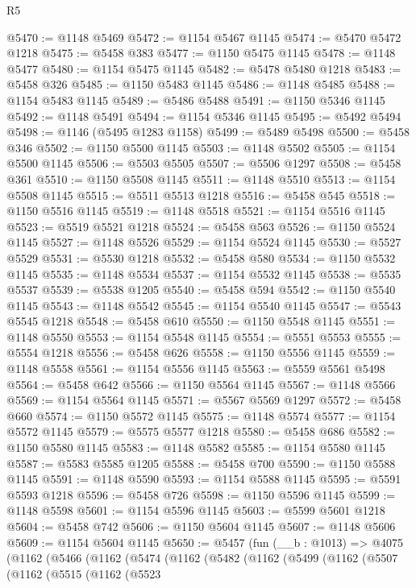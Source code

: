 \begin{lexlean}{R5}
\begin{coremodule}
@5470 := @1148 @5469
@5472 := @1154 @5467 @1145
@5474 := @5470 @5472 @1218
@5475 := @5458 @383
@5477 := @1150 @5475 @1145
@5478 := @1148 @5477
@5480 := @1154 @5475 @1145
@5482 := @5478 @5480 @1218
@5483 := @5458 @326
@5485 := @1150 @5483 @1145
@5486 := @1148 @5485
@5488 := @1154 @5483 @1145
@5489 := @5486 @5488
@5491 := @1150 @5346 @1145
@5492 := @1148 @5491
@5494 := @1154 @5346 @1145
@5495 := @5492 @5494
@5498 := @1146 (@5495 @1283 @1158)
@5499 := @5489 @5498
@5500 := @5458 @346
@5502 := @1150 @5500 @1145
@5503 := @1148 @5502
@5505 := @1154 @5500 @1145
@5506 := @5503 @5505
@5507 := @5506 @1297
@5508 := @5458 @361
@5510 := @1150 @5508 @1145
@5511 := @1148 @5510
@5513 := @1154 @5508 @1145
@5515 := @5511 @5513 @1218
@5516 := @5458 @545
@5518 := @1150 @5516 @1145
@5519 := @1148 @5518
@5521 := @1154 @5516 @1145
@5523 := @5519 @5521 @1218
@5524 := @5458 @563
@5526 := @1150 @5524 @1145
@5527 := @1148 @5526
@5529 := @1154 @5524 @1145
@5530 := @5527 @5529
@5531 := @5530 @1218
@5532 := @5458 @580
@5534 := @1150 @5532 @1145
@5535 := @1148 @5534
@5537 := @1154 @5532 @1145
@5538 := @5535 @5537
@5539 := @5538 @1205
@5540 := @5458 @594
@5542 := @1150 @5540 @1145
@5543 := @1148 @5542
@5545 := @1154 @5540 @1145
@5547 := @5543 @5545 @1218
@5548 := @5458 @610
@5550 := @1150 @5548 @1145
@5551 := @1148 @5550
@5553 := @1154 @5548 @1145
@5554 := @5551 @5553
@5555 := @5554 @1218
@5556 := @5458 @626
@5558 := @1150 @5556 @1145
@5559 := @1148 @5558
@5561 := @1154 @5556 @1145
@5563 := @5559 @5561 @5498
@5564 := @5458 @642
@5566 := @1150 @5564 @1145
@5567 := @1148 @5566
@5569 := @1154 @5564 @1145
@5571 := @5567 @5569 @1297
@5572 := @5458 @660
@5574 := @1150 @5572 @1145
@5575 := @1148 @5574
@5577 := @1154 @5572 @1145
@5579 := @5575 @5577 @1218
@5580 := @5458 @686
@5582 := @1150 @5580 @1145
@5583 := @1148 @5582
@5585 := @1154 @5580 @1145
@5587 := @5583 @5585 @1205
@5588 := @5458 @700
@5590 := @1150 @5588 @1145
@5591 := @1148 @5590
@5593 := @1154 @5588 @1145
@5595 := @5591 @5593 @1218
@5596 := @5458 @726
@5598 := @1150 @5596 @1145
@5599 := @1148 @5598
@5601 := @1154 @5596 @1145
@5603 := @5599 @5601 @1218
@5604 := @5458 @742
@5606 := @1150 @5604 @1145
@5607 := @1148 @5606
@5609 := @1154 @5604 @1145
@5650 := @5457
    (fun (__b : @1013) =>
    @4075
      (@1162
        (@5466
          (@1162
            (@5474
              (@1162
                (@5482
                  (@1162
                    (@5499
                      (@1162
                        (@5507
                          (@1162
                            (@5515
                              (@1162
                                (@5523

\end{coremodule}
\end{lexlean}
